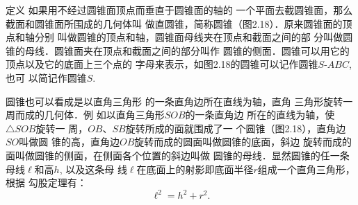 \begin{figure}[htp]\centering
    \begin{minipage}[t]{0.48\textwidth}
    \centering
{}
    \caption{}
    \end{minipage}
    \begin{minipage}[t]{0.48\textwidth}
    \centering
{}
    \caption{}
    \end{minipage}
    \end{figure}

\begin{blk}
    {定义} 如果用不经过圆锥面顶点而垂直于圆锥面的轴的
一个平面去截圆锥面，那么截面和圆锥面所围成的几何体叫
做直圆锥，简称圆锥（图2.18）．原来圆锥面的顶点和轴分别
叫做圆锥的顶点和轴，圆锥面母线夹在顶点和截面之间的部
分叫做圆锥的母线．圆锥面夹在顶点和截面之间的部分叫作
圆锥的侧面．圆锥可以用它的顶点以及它的底面上三个点的
字母来表示，如图2.18的圆锥可以记作圆锥$S$-$ABC$, 也可
以简记作圆锥$S$.
\end{blk}

圆锥也可以看成是以直角三角形
的一条直角边所在直线为轴，直角
三角形旋转一周而成的几何体．例
如以直角三角形$SOB$的一条直角边
所在的直线为轴，使$\triangle SOB$旋转一
周，$OB$、$SB$旋转所成的面就围成了一
个圆锥（图2.18），直角边$SO$叫做圆
锥的高，直角边$OB$旋转而成的圆面叫做圆锥的底面，斜边
旋转而成的面叫做圆锥的侧面，在侧面各个位置的斜边叫做
圆锥的母线．显然圆锥的任一条母线$\ell$和高$h$, 以及这条母
线$\ell$在底面上的射影即底面半径$r$组成一个直角三角形，根据
勾股定理有：
\[\ell^2=h^2+r^2.\]

